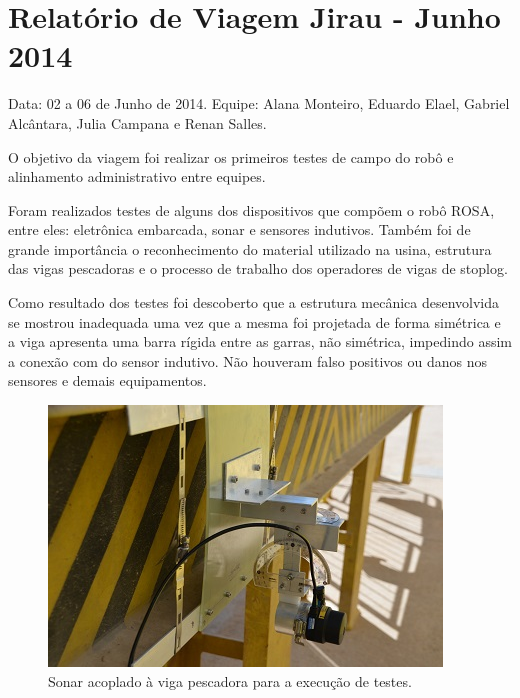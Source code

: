 \section{Relatório de Viagem Jirau - Junho 2014}
Data: 02 a 06 de Junho de 2014.
Equipe: Alana Monteiro, Eduardo Elael, Gabriel Alcântara, Julia Campana e Renan
Salles.

O objetivo da viagem foi realizar os primeiros testes de campo do robô e
alinhamento administrativo entre equipes.

Foram realizados testes de alguns dos dispositivos que compõem o
robô ROSA, entre eles: eletrônica embarcada, sonar e sensores indutivos. Também
foi de grande importância o reconhecimento do material utilizado na usina,
estrutura das vigas pescadoras e o processo de trabalho dos operadores de vigas
de stoplog.

Como resultado dos testes foi descoberto que a estrutura mecânica desenvolvida
se mostrou inadequada uma vez que a mesma foi projetada de forma simétrica e a
viga apresenta uma barra rígida entre as garras, não simétrica, impedindo assim
a conexão com do sensor indutivo. Não houveram falso positivos ou danos nos
sensores e demais equipamentos.

\begin{figure}[h!]
\centering
  \includegraphics[width=1\linewidth]{Fotos/JirauJunho2014/1.jpg}
  \caption{Sonar acoplado à viga pescadora para a execução de testes.}
  \label{nov20131}
\end{figure}

